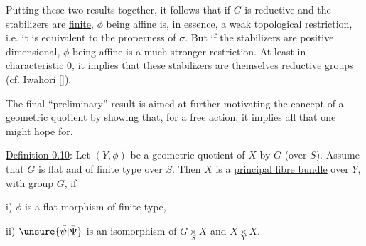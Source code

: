 
Putting these two results together, it follows that if $G$ is reductive and the stabilizers are \uline{finite}, $\phi$ being affine is, in essence, a weak topological restriction, i.e. it is equivalent to the properness of $\sigma$. But if the stabilizers are positive dimensional, $\phi$ being affine is a much stronger restriction. At least in characteristic 0, it implies that these stabilizers are themselves reductive groups (cf. Iwahori [\quad]).

The final ``preliminary'' result is aimed at further motivating the concept of a geometric quotient by showing that, for a free action, it implies all that one might hope for.

\uline{Definition 0.10}: Let $(Y,\phi)$ be a geometric quotient of $X$ by $G$ (over $S$). Assume that $G$ is flat and of finite type over $S$. Then $X$ is a \uline{principal fibre bundle} over $Y$, with group $G$, if

\qquad i) $\phi$ is a flat morphism of finite type,

\qquad ii) $\unsure{\bar\psi|\bar\Psi}$ is an isomorphism of $G\mathbin{\underset{S}{\times}}X$ and $X\mathbin{\underset{Y}{\times}}X$.


